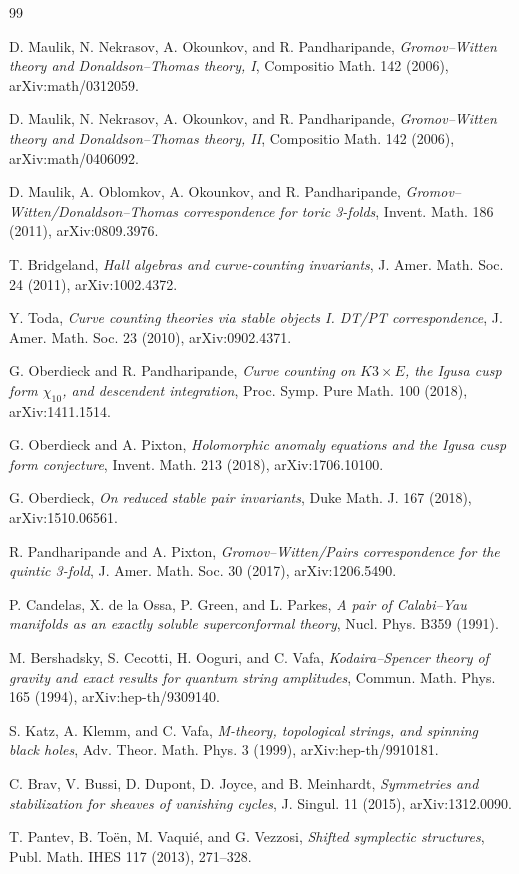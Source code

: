 \begin{thebibliography}{99}

D. Maulik, N. Nekrasov, A. Okounkov, and R. Pandharipande,
\emph{Gromov--Witten theory and Donaldson--Thomas theory, I},
Compositio Math. 142 (2006), arXiv:math/0312059.

D. Maulik, N. Nekrasov, A. Okounkov, and R. Pandharipande,
\emph{Gromov--Witten theory and Donaldson--Thomas theory, II},
Compositio Math. 142 (2006), arXiv:math/0406092.

D. Maulik, A. Oblomkov, A. Okounkov, and R. Pandharipande,
\emph{Gromov--Witten/Donaldson--Thomas correspondence for toric
3-folds}, Invent. Math. 186 (2011), arXiv:0809.3976.

T. Bridgeland,
\emph{Hall algebras and curve-counting invariants},
J. Amer. Math. Soc. 24 (2011), arXiv:1002.4372.

Y. Toda,
\emph{Curve counting theories via stable objects I. DT/PT
correspondence},
J. Amer. Math. Soc. 23 (2010), arXiv:0902.4371.

G. Oberdieck and R. Pandharipande,
\emph{Curve counting on \(K3\times E\), the Igusa cusp form
\(\chi_{10}\), and descendent integration},
Proc. Symp. Pure Math. 100 (2018), arXiv:1411.1514.

G. Oberdieck and A. Pixton,
\emph{Holomorphic anomaly equations and the Igusa cusp form
conjecture},
Invent. Math. 213 (2018), arXiv:1706.10100.

G. Oberdieck,
\emph{On reduced stable pair invariants},
Duke Math. J. 167 (2018), arXiv:1510.06561.

R. Pandharipande and A. Pixton,
\emph{Gromov--Witten/Pairs correspondence for the quintic 3-fold},
J. Amer. Math. Soc. 30 (2017), arXiv:1206.5490.

P. Candelas, X. de la Ossa, P. Green, and L. Parkes,
\emph{A pair of Calabi--Yau manifolds as an exactly soluble
superconformal theory},
Nucl. Phys. B359 (1991).

M. Bershadsky, S. Cecotti, H. Ooguri, and C. Vafa,
\emph{Kodaira--Spencer theory of gravity and exact results for quantum
string amplitudes},
Commun. Math. Phys. 165 (1994), arXiv:hep-th/9309140.

S. Katz, A. Klemm, and C. Vafa,
\emph{M-theory, topological strings, and spinning black holes},
Adv. Theor. Math. Phys. 3 (1999), arXiv:hep-th/9910181.

C. Brav, V. Bussi, D. Dupont, D. Joyce, and B. Meinhardt,
\emph{Symmetries and stabilization for sheaves of vanishing cycles},
J. Singul. 11 (2015), arXiv:1312.0090.

T. Pantev, B. To\"en, M. Vaqui\'e, and G. Vezzosi,
\emph{Shifted symplectic structures},
Publ. Math. IHES 117 (2013), 271--328.

\end{thebibliography}
